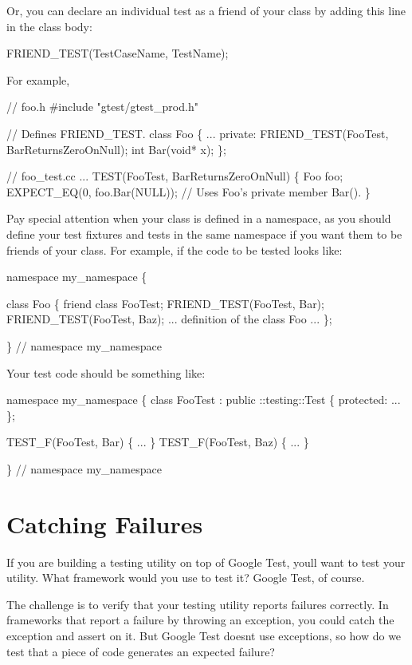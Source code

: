 Or, you can declare an individual test as a friend of your class by adding this line in the class body\+:


\begin{DoxyCode}
FRIEND\_TEST(TestCaseName, TestName);
\end{DoxyCode}


For example, 
\begin{DoxyCode}
// foo.h
#include "gtest/gtest\_prod.h"

// Defines FRIEND\_TEST.
class Foo \{
  ...
 private:
  FRIEND\_TEST(FooTest, BarReturnsZeroOnNull);
  int Bar(void* x);
\};

// foo\_test.cc
...
TEST(FooTest, BarReturnsZeroOnNull) \{
  Foo foo;
  EXPECT\_EQ(0, foo.Bar(NULL));
  // Uses Foo's private member Bar().
\}
\end{DoxyCode}


Pay special attention when your class is defined in a namespace, as you should define your test fixtures and tests in the same namespace if you want them to be friends of your class. For example, if the code to be tested looks like\+:


\begin{DoxyCode}
namespace my\_namespace \{

class Foo \{
  friend class FooTest;
  FRIEND\_TEST(FooTest, Bar);
  FRIEND\_TEST(FooTest, Baz);
  ...
  definition of the class Foo
  ...
\};

\}  // namespace my\_namespace
\end{DoxyCode}


Your test code should be something like\+:


\begin{DoxyCode}
namespace my\_namespace \{
class FooTest : public ::testing::Test \{
 protected:
  ...
\};

TEST\_F(FooTest, Bar) \{ ... \}
TEST\_F(FooTest, Baz) \{ ... \}

\}  // namespace my\_namespace
\end{DoxyCode}


\section*{Catching Failures}

If you are building a testing utility on top of Google Test, you\textquotesingle{}ll want to test your utility. What framework would you use to test it? Google Test, of course.

The challenge is to verify that your testing utility reports failures correctly. In frameworks that report a failure by throwing an exception, you could catch the exception and assert on it. But Google Test doesn\textquotesingle{}t use exceptions, so how do we test that a piece of code generates an expected failure?

